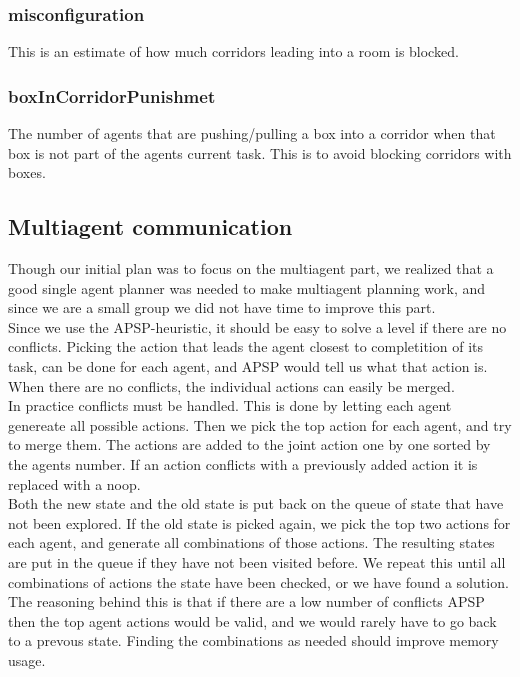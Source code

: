 \documentclass[letterpaper]{article}
\begin{document}
\subsubsection{misconfiguration}
This is an estimate of how much corridors leading into a room is blocked.

\subsubsection{boxInCorridorPunishmet}
The number of agents that are pushing/pulling a box into a corridor when that box
is not part of the agents current task. This is to avoid blocking corridors with boxes.

\subsection{Multiagent communication}
Though our initial plan was to focus on the multiagent part, we realized that
a good single agent planner was needed to make multiagent planning work,
and since we are a small group we did not have time to improve this part.\\

Since we use the APSP-heuristic, it should be easy to solve a level if
there are no conflicts. Picking the action that leads
the agent closest to completition of its task, can be done for each agent,
and APSP would tell us what that action is. When there are no conflicts,
the individual actions can easily be merged.\\

In practice conflicts must be handled. This is done by letting each agent
genereate all possible actions. Then we pick the top action for each agent,
and try to merge them. The actions are added to the joint action one by one
sorted by the agents number. If an action conflicts with a previously added
action it is replaced with a noop.\\

Both the new state and the old state is put back on the queue of state that have
not been explored. If the old state is picked again, we pick the top two actions
for each agent, and generate all combinations of those actions. The resulting states
are put in the queue if they have not been visited before. We repeat this until
all combinations of actions the state have been checked, or we have found a solution.\\

The reasoning behind this is that if there are a low number of conflicts APSP
then the top agent actions would be valid, and we would rarely have to go back
to a prevous state. Finding the combinations as needed should improve memory usage.
\end{document}
